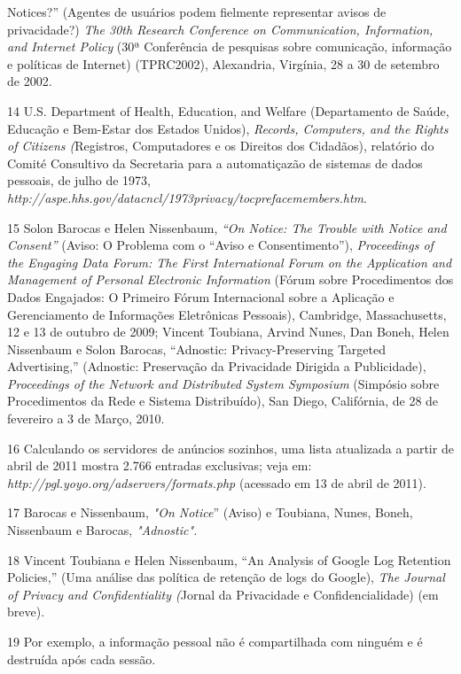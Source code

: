Notices?'' (Agentes de usuários podem fielmente representar avisos de
privacidade?) \emph{The 30th Research Conference on Communication,
Information, and Internet Policy} (30ª Conferência de pesquisas sobre
comunicação, informação e políticas de Internet) (TPRC2002), Alexandria,
Virgínia, 28 a 30 de setembro de 2002.

14 U.S. Department of Health, Education, and Welfare (Departamento de
Saúde, Educação e Bem-Estar dos Estados Unidos), \emph{Records,
Computers, and the Rights of Citizens (}Registros, Computadores e os
Direitos dos Cidadãos), relatório do Comité Consultivo da Secretaria
para a automatiçazão de sistemas de dados pessoais, de julho de 1973,
\emph{http://aspe.hhs.gov/datacncl/1973privacy/tocprefacemembers.htm}.

15 Solon Barocas e Helen Nissenbaum, \emph{``On Notice: The Trouble with
Notice and Consent''} (Aviso: O Problema com o ``Aviso e
Consentimento''), \emph{Proceedings of the Engaging Data Forum: The
First International Forum on the Application and Management of Personal
Electronic Information} (Fórum sobre Procedimentos dos Dados Engajados:
O Primeiro Fórum Internacional sobre a Aplicação e Gerenciamento de
Informações Eletrônicas Pessoais), Cambridge, Massachusetts, 12 e 13 de
outubro de 2009; Vincent Toubiana, Arvind Nunes, Dan Boneh, Helen
Nissenbaum e Solon Barocas, ``Adnostic: Privacy-Preserving Targeted
Advertising,'' (Adnostic: Preservação da Privacidade Dirigida a
Publicidade), \emph{Proceedings of the Network and Distributed System
Symposium} (Simpósio sobre Procedimentos da Rede e Sistema Distribuído),
San Diego, Califórnia, de 28 de fevereiro a 3 de Março, 2010.

16 Calculando os servidores de anúncios sozinhos, uma lista atualizada a
partir de abril de 2011 mostra 2.766 entradas exclusivas; veja em:
\emph{http://pgl.yoyo.org/adservers/formats.php}
(acessado em 13 de abril de 2011).

17 Barocas e Nissenbaum, \emph{"On Notice}'' (Aviso) e Toubiana, Nunes,
Boneh, Nissenbaum e Barocas, \emph{"Adnostic".}

18 Vincent Toubiana e Helen Nissenbaum, ``An Analysis of Google Log
Retention Policies,'' (Uma análise das política de retenção de logs do
Google), \emph{The Journal of Privacy and Confidentiality (}Jornal da
Privacidade e Confidencialidade) (em breve).

19 Por exemplo, a informação pessoal não é compartilhada com ninguém e é
destruída após cada sessão.

